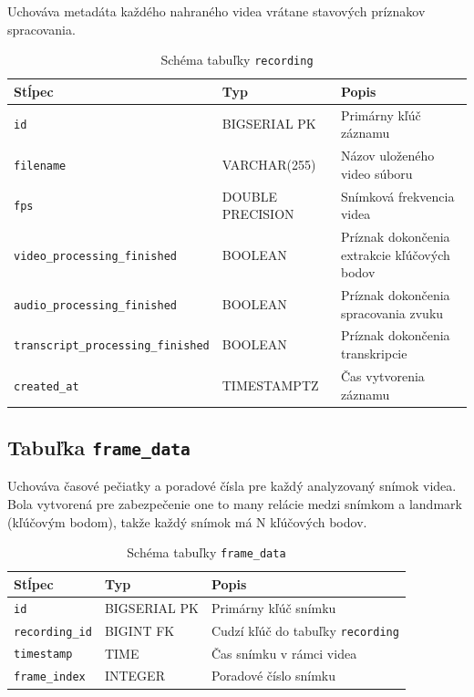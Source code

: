 Uchováva metadáta každého nahraného videa vrátane stavových príznakov spracovania.

\begin{table}[ht]
\centering
\caption{Schéma tabuľky \texttt{recording}}
\begin{tabularx}{\textwidth}{|X|X|X|}
\hline
\textbf{Stĺpec} & \textbf{Typ} & \textbf{Popis} \\
\hline
\texttt{id} & BIGSERIAL PK & Primárny kľúč záznamu \\
\texttt{filename} & VARCHAR(255) & Názov uloženého video súboru \\
\texttt{fps} & DOUBLE PRECISION & Snímková frekvencia videa \\
\texttt{video\_processing\_finished} & BOOLEAN & Príznak dokončenia extrakcie kľúčových bodov \\
\texttt{audio\_processing\_finished} & BOOLEAN & Príznak dokončenia spracovania zvuku \\
\texttt{transcript\_processing\_finished} & BOOLEAN & Príznak dokončenia transkripcie \\
\texttt{created\_at} & TIMESTAMPTZ & Čas vytvorenia záznamu \\
\hline
\end{tabularx}
\end{table}

\subsection{Tabuľka \texttt{frame\_data}}

Uchováva časové pečiatky a poradové čísla pre každý analyzovaný snímok videa.
Bola vytvorená pre zabezpečenie one to many relácie medzi snímkom a landmark (kľúčovým bodom), takže každý snímok
má N kľúčových bodov.

\begin{table}[ht]
\centering
\caption{Schéma tabuľky \texttt{frame\_data}}
\begin{tabular}{|l|l|l|}
\hline
\textbf{Stĺpec} & \textbf{Typ} & \textbf{Popis} \\
\hline
\texttt{id} & BIGSERIAL PK & Primárny kľúč snímku \\
\texttt{recording\_id} & BIGINT FK & Cudzí kľúč do tabuľky \texttt{recording} \\
\texttt{timestamp} & TIME & Čas snímku v rámci videa \\
\texttt{frame\_index} & INTEGER & Poradové číslo snímku \\
\hline
\end{tabular}
\end{table}

